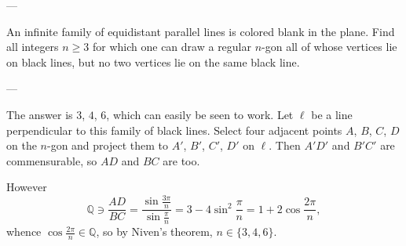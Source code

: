 
---

An infinite family of equidistant parallel lines is colored blank in the plane. Find all integers $n\ge3$ for which one can draw a regular $n$-gon all of whose vertices lie on black lines, but no two vertices lie on the same black line.

---

The answer is $3$, $4$, $6$, which can easily be seen to work. Let $\ell$ be a line perpendicular to this family of black lines. Select four adjacent points $A$, $B$, $C$, $D$ on the $n$-gon and project them to $A'$, $B'$, $C'$, $D'$ on $\ell$. Then $A'D'$ and $B'C'$ are commensurable, so $AD$ and $BC$ are too.

However \[\mathbb Q\ni\frac{AD}{BC}=\frac{\sin\frac{3\pi}n}{\sin\frac{\pi}n}=3-4\sin^2\frac{\pi}n=1+2\cos\frac{2\pi}n,\]
whence $\cos\tfrac{2\pi}n\in\mathbb Q$, so by Niven's theorem, $n\in\{3,4,6\}$.


